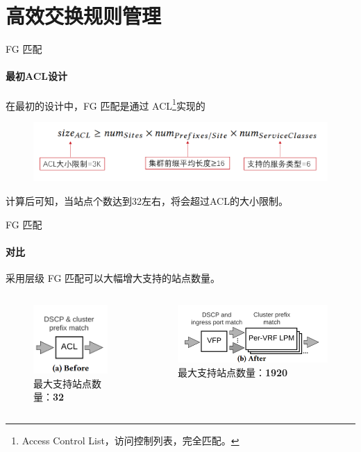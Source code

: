     \section{高效交换规则管理}
\begin{frame}{FG 匹配}
\framesubtitle{最初ACL设计}
在最初的设计中，FG 匹配是通过 ACL\footnote{Access Control List，访问控制列表，完全匹配。}实现的
\begin{figure}
    \centering
    \includegraphics[width=0.7\linewidth]{img/FG.png}
    \label{fig:my_label}
\end{figure}
计算后可知，当站点个数达到32左右，将会超过ACL的大小限制。
\end{frame}

\begin{frame}{FG 匹配}
\framesubtitle{对比}
采用层级 FG 匹配可以大幅增大支持的站点数量。
    \begin{columns}
        \begin{column}{0.4\textwidth}
        \begin{figure}
            \centering
            \includegraphics[width=0.4\linewidth]{img/FG2.png}
            \caption{最大支持站点数量：\textbf{32}}
        \end{figure}
        \end{column}
        \begin{column}{0.4\textwidth}
            \begin{figure}
            \centering
            \includegraphics[width=0.8\linewidth]{img/FG3.png}
            \caption{最大支持站点数量：\textbf{1920}}
        \end{figure}
        \end{column}
    \end{columns}
\end{frame}


